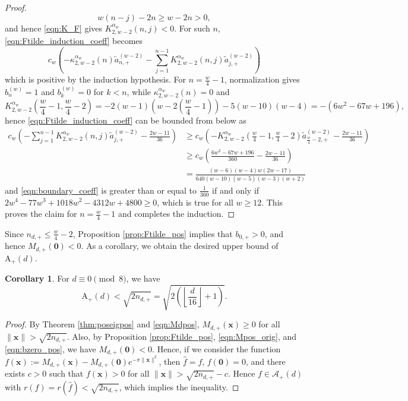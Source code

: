 \documentclass[10pt,reqno]{amsproc}
\newcommand{\what}[1]{\widehat{#1}}
\newcommand{\rA}{\mathrm{A}}
\newcommand{\bx}{\mathbf{x}}
\newcommand{\1}{\mathds{1}}	%
\theoremstyle{definition}
\newtheorem{corollary}[theorem]{Corollary}
\theoremstyle{remark}
\begin{document}
\begin{proof}
    \[
        w(n-j)-2n \geq w-2n>0,
    \]
    and hence \eqref{eqn:K_F} gives $K_{2,w-2}^{\alpha_w}(n,j)<0$.
    For such $n$, \eqref{eqn:Ftilde_induction_coeff} becomes
    \[
        c_w\left(- \kappa_{2,w-2}^{\alpha_w}(n) \tilde{a}_{n,+}^{(w-2)} - \sum_{j=1}^{n-1} K_{2,w-2}^{\alpha_w}(n,j)\tilde{a}_{j,+}^{(w-2)}\right)
    \]
    which is positive by the induction hypothesis.
    For $n = \frac{w}{4} - 1$, normalization gives $b_n^{(w)}=1$ and $b_k^{(w)}=0$ for $k<n$, while $\kappa_{2,w-2}^{\alpha_w}(n) = 0$ and
    \[
    K_{2,w-2}^{\alpha_w}\left(\frac{w}{4}-1, \frac{w}{4}-2\right) = -2(w-1)\left(w - 2\left(\frac{w}{4}-1\right)\right) - 5(w-10)(w-4) = -(6w^2 - 67w + 196),
    \]
    hence \eqref{eqn:Ftilde_induction_coeff} can be bounded from below as
    \begin{align}
        c_w\left(-\sum_{j=1}^{n-1} K_{2,w-2}^{\alpha_w}(n,j)\tilde{a}_{j,+}^{(w-2)} - \frac{2w-11}{36}\right) &\ge c_w \left(-K_{2,w-2}^{\alpha_w}\left(\frac{w}{4}-1, \frac{w}{4}-2\right) \tilde{a}_{\frac{w}{4}-2,+}^{(w-2)} - \frac{2w-11}{36}\right) \nonumber \\
        &\ge c_w \left(\frac{6w^2 - 67w + 196}{360} - \frac{2w - 11}{36}\right) \nonumber \\
        &= \frac{(w-6)(w-4)w(2w-17)}{640(w-10)(w-5)(w-3)(w+2)} \label{eqn:boundary_coeff}
    \end{align}
    and \eqref{eqn:boundary_coeff} is greater than or equal to $\frac{1}{360}$ if and only if $2w^4 - 77w^3 + 1018 w^2 - 4312 w + 4800 \ge 0$, which is true for all $w \ge 12$.
    This proves the claim for $n = \frac{w}{4} - 1$ and completes the induction.
\end{proof}

Since $n_{d,+} \le \frac{w}{4} - 2$, Proposition \ref{prop:Ftilde_pos} implies that $b_{0,+} > 0$, and hence $M_{d,+}(\mathbf{0}) < 0$.
As a corollary, we obtain the desired upper bound of $\rA_+(d)$.

\begin{corollary}
    \label{cor:Apos_0mod8}
    For $d \equiv 0 \pmod{8}$, we have
    \[
        \rA_+(d) < \sqrt{2n_{d,+}} = \sqrt{2\left(\left\lfloor\frac{d}{16}\right\rfloor + 1\right)}.
    \]
\end{corollary}
\begin{proof}
    By Theorem \ref{thm:poseigpos} and \eqref{eqn:Mdpos}, $M_{d,+}(\bx) \geq 0$ for all $\|\bx\| > \sqrt{2n_{d,+}}$.
    Also, by Proposition \ref{prop:Ftilde_pos}, \eqref{eqn:Mpos_orig}, and \eqref{eqn:bzero_pos}, we have $M_{d,+}(\mathbf{0}) < 0$.
    Hence, if we consider the function $f(\bx) := M_{d,+}(\bx) - M_{d,+}(\mathbf{0}) e^{-\pi \|\bx\|^2}$, then $\what{f} = f$, $f(\mathbf{0}) = 0$, and there exists $c > 0$ such that $f(\bx) > 0$ for all $\|\bx\| > \sqrt{2n_{d,+}} - c$.
    Hence $f \in \mathcal{A}_+(d)$ with $r(f) = r(\what{f}) < \sqrt{2n_{d,+}}$, which implies the inequality.
\end{proof}
\end{document}
